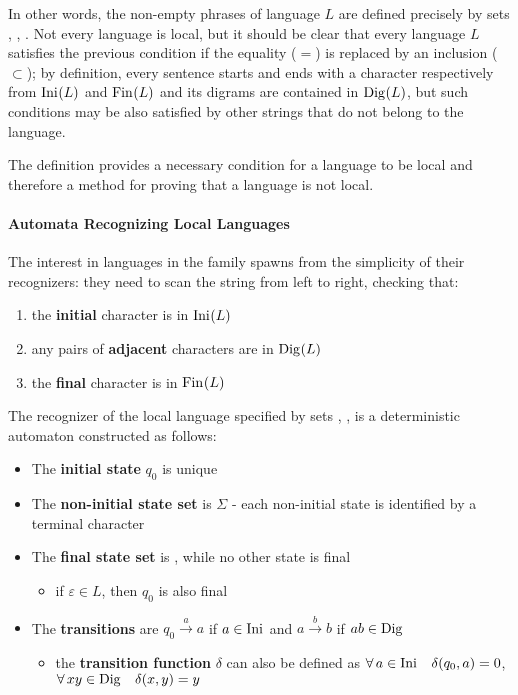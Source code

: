 \documentclass[english]{article}
\begin{document}
\bigskip
In other words, the non-empty phrases of language \(L\) are defined precisely by sets \Ini, \Fin, \Dig.
Not every language is local, but it should be clear that every language \(L\) satisfies the previous condition if the equality (\(=\)) is replaced by an inclusion (\(\subset\));
by definition, every sentence starts and ends with a character respectively from \(\text{Ini}\hspace{0.1ex}(L)\) and \(\text{Fin}\hspace{0.1ex}(L)\) and its digrams are contained in \(\text{Dig}\hspace{0.1ex}(L)\), but such conditions may be also satisfied by other strings that do not belong to the language.

The definition provides a necessary condition for a language to be local and therefore a method for proving that a language is not local.

\paragraph{Automata Recognizing Local Languages}

The interest in languages in the \LOC family spawns from the simplicity of their recognizers:
they need to scan the string from left to right, checking that:

\begin{enumerate}
  \item the \textbf{initial} character is in \(\text{Ini}\hspace{0.1ex}(L)\)
  \item any pairs of \textbf{adjacent} characters are in \(\text{Dig}\hspace{0.1ex}(L)\)
  \item the \textbf{final} character is in \(\text{Fin}\hspace{0.1ex}(L)\)
\end{enumerate}

\bigskip
The recognizer of the local language specified by sets \Ini, \Fin, \Dig is a deterministic automaton constructed as follows:

\begin{itemize}
  \item The \textbf{initial state} \(q_0\) is unique
  \item The \textbf{non-initial state set} is \(\Sigma\) - each non-initial state is identified by a terminal character
  \item The \textbf{final state set} is \Fin, while no other state is final
        \begin{itemize}[label=\(\rightarrow\)]
          \item if \(\varepsilon \in L\), then \(q_0\) is also final
        \end{itemize}
  \item The \textbf{transitions} are \(q_0 \xrightarrow{a} a\) if \(a \in \text{Ini}\hspace{0.1ex}\) and \(a \xrightarrow{b} b\) if \(ab \in \text{Dig}\hspace{0.1ex}\)
        \begin{itemize}[label=\(\rightarrow\)]
          \item the \textbf{transition function} \(\delta\) can also be defined as \(\forall \, a \in \text{Ini}\hspace{0.1ex} \quad \delta(q_0, a) = 0\), \(\forall \, xy \in \text{Dig}\hspace{0.1ex} \quad \delta(x, y) = y\)
        \end{itemize}
\end{itemize}
\end{document}
